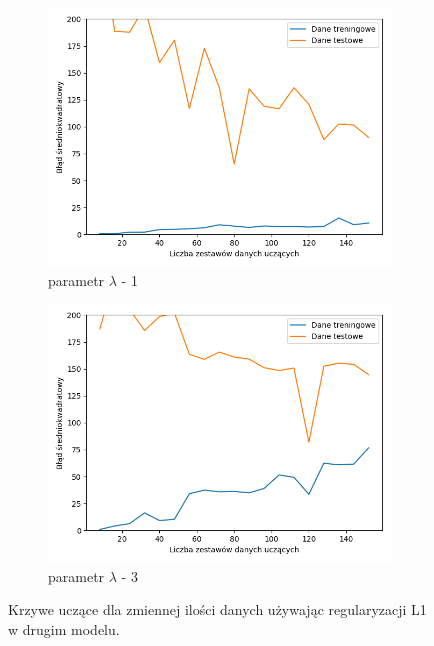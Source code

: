 \documentclass[12pt]{aghdpl}
\begin{document}
\begin{figure}[h]
		 	\begin{subfigure}{.5\linewidth}
		 		\includegraphics[width =\linewidth]{wykresy/6_regularyzacja/l1/regularyzacja_1_learning_curves.png}
		 		\caption{parametr $\lambda$ - 1}
		 	\end{subfigure}
		 	\begin{subfigure}{.5\linewidth}
		 		\includegraphics[width =\linewidth]{wykresy/6_regularyzacja/l1/regularyzacja_3_learning_curves.png}
		 		\caption{parametr $\lambda$ - 3}
		 	\end{subfigure}
		  	
		  	\caption{Krzywe uczące dla zmiennej ilości danych używając regularyzacji L1 w drugim modelu.}
			\label{fig: drugi_model_przy_regularyzacji_l1_learning_curves}
		\end{figure}
		 	
\end{document}
